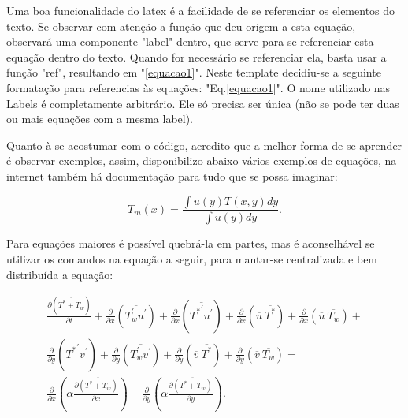 Uma boa funcionalidade do latex é a facilidade de se referenciar os elementos do texto. Se observar com atenção a função que deu origem a esta equação, observará uma componente "label" dentro, que serve para se referenciar esta equação dentro do texto. Quando for necessário se referenciar ela, basta usar a função "ref", resultando em "\ref{equacao1}". Neste template decidiu-se a seguinte formatação para referencias às equações: "Eq.\ref{equacao1}". O nome utilizado nas Labels é completamente arbitrário. Ele só precisa ser única (não se pode ter duas ou mais equações com a mesma label).

Quanto à se acostumar com o código, acredito que a melhor forma de se aprender é observar exemplos, assim, disponibilizo abaixo vários exemplos de equações, na internet também há documentação para tudo que se possa imaginar: 

\begin{equation}
T_m(x) = \frac{\int u(y) T(x , y) dy}{\int u(y)  dy} .
\end{equation}

Para equações maiores é possível quebrá-la em partes, mas é aconselhável se utilizar os comandos na equação a seguir, para mantar-se centralizada e bem distribuída a equação:

\begin{center}
\begin{equation}
	\begin{split}
	\frac{\partial ( \overline{ T^\ast + T_w } ) }{\partial t} +
	\frac{\partial{}}{\partial{x}} \left(\overline{T_w^{\prime} u^{\prime}}\right) +\frac{\partial{}}{\partial{x}} \left(\overline{{T^{\ast}}^{\prime} u^{\prime}}\right)
	+\frac{\partial{}}{\partial{x}}\left(\overline{u} \ \overline{T^{\ast}}\right)+ 
	\frac{\partial{}}{\partial{x}}\left(\overline{u} \ \overline{T_w}\right)+ 
	\\
	\frac{\partial{}}{\partial{y}} \left(\overline{{T^{\ast}}^{\prime} v^{\prime}}\right)+
	\frac{\partial{}}{\partial{y}} \left(\overline{T_w^\prime v^\prime}\right) + \frac{\partial{}}{\partial{y}}\left(\overline{v} \ \overline{T^\ast}\right) +
	\frac{\partial{}}{\partial{y}}\left(\overline{v} \ \overline{T_w}\right) 
	= 
	\\
	{\frac{\partial{}}{\partial{x}}} \left(\alpha {\frac{\partial{\overline{(T^\ast + T_w)}}}{\partial{x}}} \right) +
	{\frac{\partial{}}{\partial{y}}} \left(\alpha {\frac{\partial{\overline{(T^\ast + T_w)}}}{\partial{y}}} \right) .
	\end{split}
\end{equation}
\end{center}

